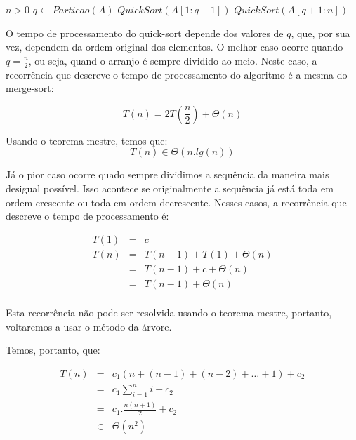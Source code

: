 \begin{codebox}
  \li \If $n > 0$
  \li \Then  $q \gets Particao(A)$
  \li $QuickSort(A[1:q-1])$
  \li $QuickSort(A[q+1:n])$
\end{codebox}

O tempo de processamento do quick-sort depende dos valores de $q$, que, por sua vez, dependem da ordem original dos elementos.
O melhor caso ocorre quando $q = \frac{n}{2}$, ou seja, quand o arranjo é sempre dividido ao meio.
Neste caso, a recorrência que descreve o tempo de processamento do algoritmo é a mesma do merge-sort:

\begin{displaymath}
  T(n) = 2T\left( \frac{n}{2}\right) + \Theta(n)
\end{displaymath}

Usando o teorema mestre, temos que:
\begin{displaymath}
 T(n) \in \Theta(n.lg(n))
\end{displaymath}

Já o pior caso ocorre quado sempre dividimos a sequência da maneira mais desigual possível.
Isso acontece se originalmente a sequência já está toda em ordem crescente ou toda em ordem decrescente.
Nesses casos, a recorrência que descreve o tempo de processamento é:

\begin{eqnarray*}
  T(1) & = &  c\\
  T(n) & = & T(n-1) + T(1) + \Theta(n)\\
  & = & T(n-1) + c + \Theta(n)\\
  & = & T(n-1) + \Theta(n)\\
\end{eqnarray*}

Esta recorrência não pode ser resolvida usando o teorema mestre, portanto, voltaremos a usar o método da árvore.

\begin{center}
\end{center}

Temos, portanto, que:

\begin{eqnarray*}
  T(n) & = & c_1(n + (n-1) + (n-2) + \dots + 1) + c_2 \\
  & = & c_1 \sum_{i=1}^n i + c_2 \\
  & = & c_1.\frac{n(n+1)}{2} + c_2\\
  & \in & \Theta(n^2)
\end{eqnarray*}

